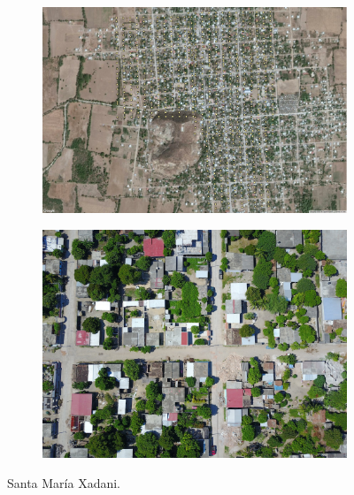 \begin{figure}[!ht]
  \centering
    \begin{subfigure}{.8\textwidth}
        \includegraphics[width=\textwidth]{images/santamaria-satellite.jpg}
    \end{subfigure}
    \begin{subfigure}{.8\textwidth}
        \includegraphics[width=\textwidth]{images/santamaria-sample.jpg}
    \end{subfigure}
  \caption{Santa Mar\'ia Xadani.}
  \label{fig:santamaria}
\end{figure}

